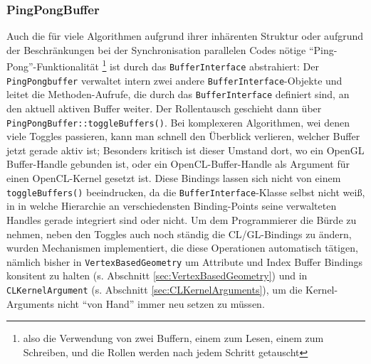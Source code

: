 	\subsubsection{PingPongBuffer}
	Auch die für viele Algorithmen aufgrund ihrer inhärenten Struktur oder aufgrund der Beschränkungen bei der 	
	Synchronisation parallelen Codes nötige "`Ping-Pong"'-Funktionalität \footnote{also die Verwendung von zwei Buffern, 
	einem zum Lesen, einem zum Schreiben, und die Rollen werden nach jedem Schritt getauscht} ist durch das
	\lstinline|BufferInterface| abstrahiert: Der \lstinline|PingPongbuffer| verwaltet intern zwei andere
	\lstinline|BufferInterface|-Objekte und leitet die Methoden-Aufrufe, die durch das \lstinline|BufferInterface| 
	definiert sind,	an den aktuell aktiven Buffer weiter. Der Rollentausch geschieht dann über 
	\lstinline|PingPongBuffer::toggleBuffers()|.
	Bei komplexeren Algorithmen, wei denen viele Toggles passieren, kann man schnell den Überblick verlieren, welcher
	Buffer jetzt gerade aktiv ist; Besonders kritisch ist dieser Umstand dort, wo ein OpenGL Buffer-Handle
	gebunden ist, oder ein OpenCL-Buffer-Handle als Argument für einen OpenCL-Kernel gesetzt ist.
	Diese Bindings lassen sich nicht von einem \lstinline|toggleBuffers()| beeindrucken, 
	da die \lstinline|BufferInterface|-Klasse selbst nicht weiß, in in welche Hierarchie an verschiedensten Binding-Points
	seine verwalteten Handles gerade integriert sind oder nicht.
	Um dem Programmierer die Bürde zu nehmen, neben den Toggles auch noch ständig die CL/GL-Bindings zu ändern,
	wurden Mechanismen implementiert, die diese Operationen automatisch tätigen, nämlich bisher in 
	\lstinline|VertexBasedGeometry| um Attribute und Index Buffer Bindings konsitent zu halten 
	(s. Abschnitt \ref{sec:VertexBasedGeometry}) und in
	\lstinline|CLKernelArgument| (s. Abschnitt \ref{sec:CLKernelArguments}), um die Kernel-Arguments nicht "`von Hand"'
	immer neu setzen zu müssen.
	